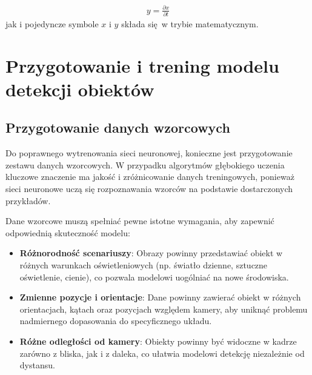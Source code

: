 \documentclass[a4paper,twoside,12pt]{book}
\newtheorem{Definition}{Definicja}
\newtheorem{Example}{Przykład}
\newtheorem{Theorem}{Twierdzenie}
\begin{document}
\begin{align}
y = \frac{\partial x}{\partial t}
\end{align}
jak i pojedyncze symbole $x$ i $y$  składa się w trybie matematycznym.


%
%





\chapter{Przygotowanie i trening modelu detekcji obiektów}
\label{ch:Przygotowanie-i-trening-modelu}
\section{Przygotowanie danych wzorcowych}
Do poprawnego wytrenowania sieci neuronowej, konieczne jest przygotowanie zestawu danych wzorcowych. W przypadku algorytmów głębokiego uczenia kluczowe znaczenie ma jakość i zróżnicowanie danych treningowych, ponieważ sieci neuronowe uczą się rozpoznawania wzorców na podstawie dostarczonych przykładów. 

Dane wzorcowe muszą spełniać pewne istotne wymagania, aby zapewnić odpowiednią skuteczność modelu:
\begin{itemize}
    \item \textbf{Różnorodność scenariuszy}: Obrazy powinny przedstawiać obiekt w różnych warunkach oświetleniowych (np. światło dzienne, sztuczne oświetlenie, cienie), co pozwala modelowi uogólniać na nowe środowiska.
    \item \textbf{Zmienne pozycje i orientacje}: Dane powinny zawierać obiekt w różnych orientacjach, kątach oraz pozycjach względem kamery, aby uniknąć problemu nadmiernego dopasowania do specyficznego układu.
    \item \textbf{Różne odległości od kamery}: Obiekty powinny być widoczne w kadrze zarówno z bliska, jak i z daleka, co ułatwia modelowi detekcję niezależnie od dystansu.
\end{itemize}
\end{document}
